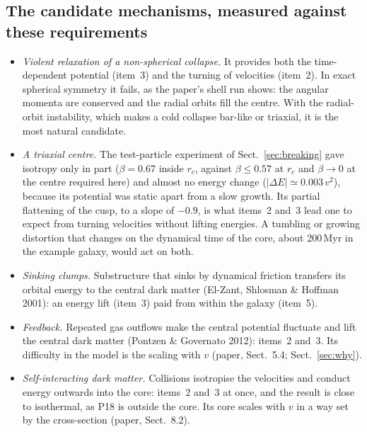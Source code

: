 \documentclass[11pt,a4paper]{article}
\newcommand{\rc}{r_c}
\begin{document}
\subsection{The candidate mechanisms, measured against these requirements}
\begin{itemize}
\item \emph{Violent relaxation of a non-spherical collapse.} It provides both the
  time-dependent potential (item~3) and the turning of velocities (item~2). In
  exact spherical symmetry it fails, as the paper's shell run shows: the angular
  momenta are conserved and the radial orbits fill the centre. With the radial-orbit
  instability, which makes a cold collapse bar-like or triaxial, it is the most
  natural candidate.
\item \emph{A triaxial centre.} The test-particle experiment of
  Sect.~\ref{sec:breaking} gave isotropy only in part ($\beta=0.67$ inside $\rc$, against $\beta\le
  0.57$ at $\rc$ and $\beta\to0$ at the centre required here) and almost no energy
  change ($|\Delta E|\simeq0.003\,v^2$), because its potential was static apart from
  a slow growth. Its partial flattening of the cusp, to a slope of $-0.9$, is what
  items~2 and~3 lead one to expect from turning velocities without lifting energies.
  A tumbling or growing distortion that changes on the dynamical time of the core,
  about 200\,Myr in the example galaxy, would act on both.
\item \emph{Sinking clumps.} Substructure that sinks by dynamical friction transfers
  its orbital energy to the central dark matter (El-Zant, Shlosman \& Hoffman 2001):
  an energy lift (item~3) paid from within the galaxy (item~5).
\item \emph{Feedback.} Repeated gas outflows make the central potential fluctuate and
  lift the central dark matter (Pontzen \& Governato 2012): items~2 and~3. Its
  difficulty in the model is the scaling with $v$ (paper, Sect.~5.4;
  Sect.~\ref{sec:why}).
\item \emph{Self-interacting dark matter.} Collisions isotropise the velocities and
  conduct energy outwards into the core: items~2 and~3 at once, and the result is
  close to isothermal, as P18 is outside the core. Its core scales with $v$ in a way
  set by the cross-section (paper, Sect.~8.2).
\end{itemize}
\end{document}
